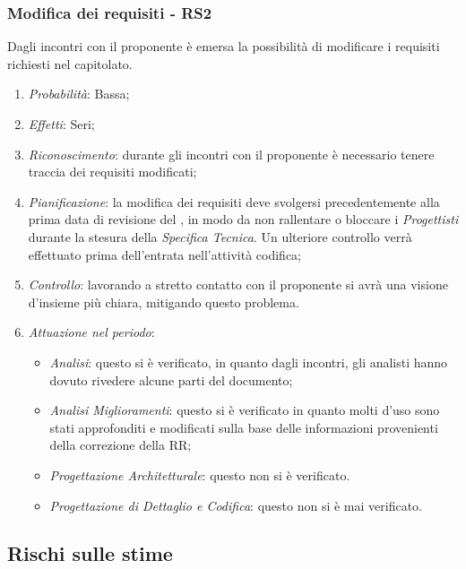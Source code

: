 \subsubsection{Modifica dei requisiti - RS2}
Dagli incontri con il proponente \`e emersa la possibilit\`a di modificare i requisiti richiesti nel capitolato.
\begin{enumerate}
\item \textit{Probabilit\`a}: Bassa;
\item \textit{Effetti}: Seri;
\item \textit{Riconoscimento}: durante gli incontri con il proponente è necessario tenere traccia dei requisiti modificati;
\item \textit{Pianificazione}: la modifica dei requisiti deve svolgersi precedentemente alla prima data di revisione del , in modo da non rallentare o bloccare i \textit{Progettisti} durante la stesura della \textit{Specifica Tecnica}. Un ulteriore controllo verr\`a effettuato prima dell'entrata nell'attivit\`a codifica;
\item \textit{Controllo}: lavorando a stretto contatto con il proponente si avr\`a una visione d'insieme pi\`u chiara, mitigando questo problema.
\item \textit{Attuazione nel periodo}: 
	\begin{itemize}
	\item \textit{Analisi}: questo  si è verificato, in quanto dagli incontri, gli analisti hanno dovuto rivedere alcune parti del documento;
	\item \textit{Analisi Miglioramenti}: questo  si è verificato in quanto molti  d'uso sono stati approfonditi e modificati sulla base delle informazioni provenienti della correzione della RR;
	\item \textit{Progettazione Architetturale}: questo  non si è verificato.
	\item \textit{Progettazione di Dettaglio e Codifica}: questo  non si è mai verificato.
	\end{itemize}
\end{enumerate}

\subsection{Rischi sulle stime}
